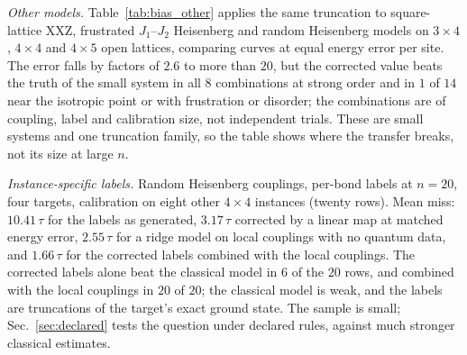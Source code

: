 \documentclass[aps,prx,onecolumn,10pt,nofootinbib,longbibliography,floatfix]{revtex4-2}
\theoremstyle{remark}
\begin{document}
\emph{Other models.} Table~\ref{tab:bias_other} applies the same truncation to square-lattice XXZ, frustrated
$J_1$--$J_2$ Heisenberg and random Heisenberg models on $3\times4$, $4\times4$ and $4\times5$ open lattices, comparing %
curves at equal energy error per site. The error falls by factors of $2.6$ to more than $20$, but the corrected value %
beats the truth of the small system in all $8$ combinations at strong order and in $1$ of $14$ near the isotropic %
point or with frustration or disorder; the combinations are of coupling, label and calibration size, not independent
trials. These are small systems and one truncation family, so the table shows where the
transfer breaks, not its size at large $n$.
\def\SMcap{Transfer of the bias curve to $n=20$ at equal energy error per site: mean miss in units of $\tau$. Last column: the truth of the calibration size used as the answer.}\def\SMlab{tab:bias_other} %


\emph{Instance-specific labels.} Random Heisenberg couplings, per-bond labels at $n=20$, four targets, calibration on %
eight other $4\times4$ instances (twenty rows). Mean miss: $10.41\,\tau$ for the labels as generated, $3.17\,\tau$ %
corrected by a linear map at matched energy error, $2.55\,\tau$ for a ridge model on local couplings with no quantum %
data, and $1.66\,\tau$ for the corrected labels combined with the local couplings. The corrected labels alone beat the %
classical model in $6$ of the $20$ rows, and combined with the local couplings in $20$ of $20$; the classical model is %
weak, and the labels are truncations of the target's exact ground state. The sample is small; Sec.~\ref{sec:declared}
tests the question under declared rules, against much stronger classical estimates.
\end{document}

